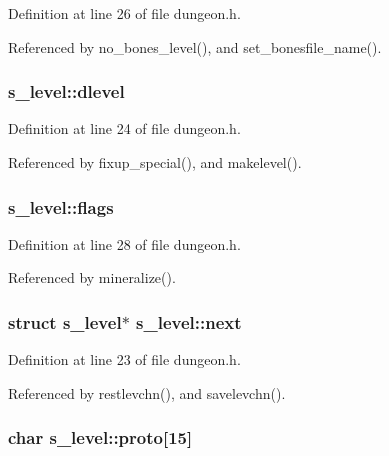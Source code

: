 Definition at line 26 of file dungeon.\+h.



Referenced by no\+\_\+bones\+\_\+level(), and set\+\_\+bonesfile\+\_\+name().

\hypertarget{structs__level_a34833da474dd639dacf93784e2d18db9}{
\subsubsection[{dlevel}]{ s\+\_\+level\+::dlevel}}\label{structs__level_a34833da474dd639dacf93784e2d18db9}


Definition at line 24 of file dungeon.\+h.



Referenced by fixup\+\_\+special(), and makelevel().

\hypertarget{structs__level_a4be64684499b0c49bc84fafe05f83aff}{
\subsubsection[{flags}]{ s\+\_\+level\+::flags}}\label{structs__level_a4be64684499b0c49bc84fafe05f83aff}


Definition at line 28 of file dungeon.\+h.



Referenced by mineralize().

\hypertarget{structs__level_a05f0992e55967b904dd299418a2058da}{
\subsubsection[{next}]{\setlength{\rightskip}{0pt plus 5cm}struct {\bf s\+\_\+level}$\ast$ s\+\_\+level\+::next}}\label{structs__level_a05f0992e55967b904dd299418a2058da}


Definition at line 23 of file dungeon.\+h.



Referenced by restlevchn(), and savelevchn().

\hypertarget{structs__level_ab678712bf46b72e78ee0f18119bece65}{
\subsubsection[{proto}]{\setlength{\rightskip}{0pt plus 5cm}char s\+\_\+level\+::proto\mbox{[}15\mbox{]}}}\label{structs__level_ab678712bf46b72e78ee0f18119bece65}


